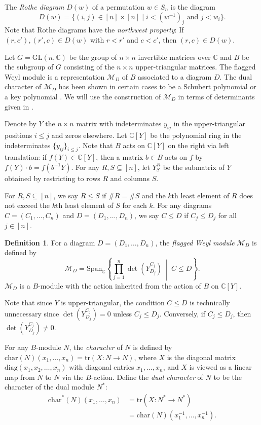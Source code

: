 \documentclass{amsart}
\theoremstyle{definition}
\newtheorem{definition}[theorem]{Definition}
\theoremstyle{named}
\begin{document}
	The \emph{Rothe diagram} $D(w)$ of a permutation $w\in S_n$ is the diagram
	\[ D(w)=\{(i,j)\in [n]\times [n] \mid i<(w^{-1})_j\mbox{ and } j<w_i \}. \]
	Note that Rothe diagrams have the \emph{northwest property}: If $(r,c'),(r',c)\in D(w)$ with $r<r'$ and $c<c'$, then $(r,c)\in D(w)$.

	Let $G=\mathrm{GL}(n,\mathbb{C})$ be the group of $n\times n$ invertible matrices over $\mathbb{C}$ and $B$ be the subgroup of $G$ consisting of the $n\times n$ upper-triangular matrices. The flagged Weyl module is a representation $\mathcal{M}_D$ of $B$ associated to a diagram $D$. The dual character of $\mathcal{M}_D$ has been shown in certain cases to be a Schubert polynomial \cite{KP} or a key polynomial \cite{flaggedLRrule}. We will use the construction of $\mathcal{M}_D$ in terms of determinants given in \cite{magyar}.

	Denote by $Y$ the $n\times n$ matrix with indeterminates $y_{ij}$ in the upper-triangular positions $i\leq j$ and zeros elsewhere. Let $\mathbb{C}[Y]$ be the polynomial ring in the indeterminates $\{y_{ij}\}_{i\leq j}$. Note that $B$ acts on $\mathbb{C}[Y]$ on the right via left translation: if $f(Y)\in \mathbb{C}[Y]$, then a matrix $b\in B$ acts on $f$ by $f(Y)\cdot b=f(b^{-1}Y)$. For any $R,S\subseteq [n]$, let $Y_S^R$ be the submatrix of $Y$ obtained by restricting to rows $R$ and columns $S$.

	For $R,S\subseteq [n]$, we say $R\leq S$ if $\#R=\#S$ and the $k$\/th least element of $R$ does not exceed the $k$\/th least element of $S$ for each $k$. For any diagrams $C=(C_1,\ldots, C_n)$ and $D=(D_1,\ldots, D_n)$, we say $C\leq D$ if $C_j\leq D_j$ for all $j\in[n]$.

	\begin{definition}
		For a diagram $D=(D_1,\ldots, D_n)$, the \emph{flagged Weyl module} $\mathcal{M}_D$ is defined by
		\[\mathcal{M}_D=\mathrm{Span}_\mathbb{C}\left\{\prod_{j=1}^{n}\det\left(Y_{D_j}^{C_j}\right)\ \middle|\   C\leq D \right\}. \]
		$\mathcal{M}_D$ is a $B$-module with the action inherited from the action of $B$ on $\mathbb{C}[Y]$. 
	\end{definition}
	Note that since $Y$ is upper-triangular, the condition $C\leq D$ is technically unnecessary since $\det\left(Y_{D_j}^{C_j}\right)=0$ unless $C_j\leq D_j$. Conversely, if $C_j\leq D_j$, then $\det\left(Y_{D_j}^{C_j}\right)\neq 0$. 

	For any $B$-module $N$, the \emph{character} of $N$ is defined by $\mathrm{char}(N)(x_1,\ldots,x_n)=\mathrm{tr}\left(X:N\to N\right)$, where $X$ is the diagonal matrix $\mathrm{diag}(x_1,x_2,\ldots,x_n)$ with diagonal entries $x_1,\ldots,x_n$, and $X$ is viewed as a linear map from $N$ to $N$ via the $B$-action. Define the \emph{dual character} of $N$ to be the character of the dual module $N^*$:
	\begin{align*}
		\mathrm{char}^*(N)(x_1,\ldots,x_n)&=\mathrm{tr}\left(X:N^*\to N^*\right) \\
		&=\mathrm{char}(N)(x_1^{-1},\ldots,x_n^{-1}).
	\end{align*}
\end{document}

